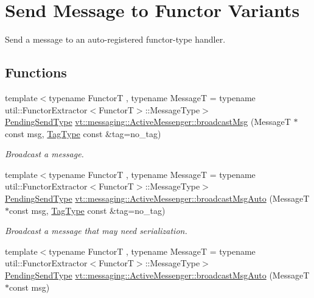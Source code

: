 \hypertarget{group__functorsend}{}\section{Send Message to Functor Variants}
\label{group__functorsend}


Send a message to an auto-\/registered functor-\/type handler.  


\subsection*{Functions}
\begin{DoxyCompactItemize}
\item 
{\footnotesize template$<$typename FunctorT , typename MessageT  = typename util\+::\+Functor\+Extractor$<$\+Functor\+T$>$\+::\+Message\+Type$>$ }\\\hyperlink{structvt_1_1messaging_1_1_active_messenger_a3626a6ca76d8ad4ec7c3b47a2c70d3a8}{Pending\+Send\+Type} \hyperlink{group__functorsend_gaa5b764aaa06e9c9141b04f6d8a420d43}{vt\+::messaging\+::\+Active\+Messenger\+::broadcast\+Msg} (MessageT $\ast$const msg, \hyperlink{namespacevt_a84ab281dae04a52a4b243d6bf62d0e52}{Tag\+Type} const \&tag=no\+\_\+tag)
\begin{DoxyCompactList}\small\item\em Broadcast a message. \end{DoxyCompactList}\item 
{\footnotesize template$<$typename FunctorT , typename MessageT  = typename util\+::\+Functor\+Extractor$<$\+Functor\+T$>$\+::\+Message\+Type$>$ }\\\hyperlink{structvt_1_1messaging_1_1_active_messenger_a3626a6ca76d8ad4ec7c3b47a2c70d3a8}{Pending\+Send\+Type} \hyperlink{group__functorsend_gad896e15fd2c34447ae4cc5b0f6dd211f}{vt\+::messaging\+::\+Active\+Messenger\+::broadcast\+Msg\+Auto} (MessageT $\ast$const msg, \hyperlink{namespacevt_a84ab281dae04a52a4b243d6bf62d0e52}{Tag\+Type} const \&tag=no\+\_\+tag)
\begin{DoxyCompactList}\small\item\em Broadcast a message that may need serialization. \end{DoxyCompactList}\item 
{\footnotesize template$<$typename FunctorT , typename MessageT  = typename util\+::\+Functor\+Extractor$<$\+Functor\+T$>$\+::\+Message\+Type$>$ }\\\hyperlink{structvt_1_1messaging_1_1_active_messenger_a3626a6ca76d8ad4ec7c3b47a2c70d3a8}{Pending\+Send\+Type} \hyperlink{group__functorsend_gad73652d3cef1ea2ea1df3a2ca38ee7ba}{vt\+::messaging\+::\+Active\+Messenger\+::broadcast\+Msg\+Auto} (MessageT $\ast$const msg)

\end{DoxyCompactItemize}
